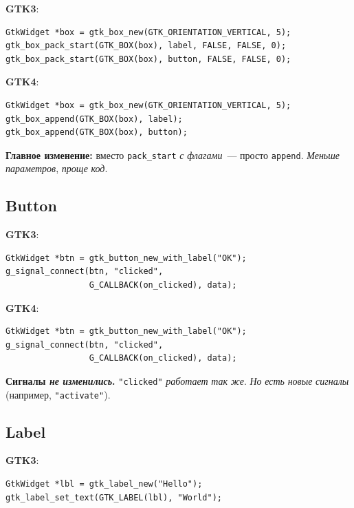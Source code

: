 \textbf{GTK3}:
\begin{verbatim}
GtkWidget *box = gtk_box_new(GTK_ORIENTATION_VERTICAL, 5);
gtk_box_pack_start(GTK_BOX(box), label, FALSE, FALSE, 0);
gtk_box_pack_start(GTK_BOX(box), button, FALSE, FALSE, 0);
\end{verbatim}

\textbf{GTK4}:
\begin{verbatim}
GtkWidget *box = gtk_box_new(GTK_ORIENTATION_VERTICAL, 5);
gtk_box_append(GTK_BOX(box), label);
gtk_box_append(GTK_BOX(box), button);
\end{verbatim}

\begin{keybox}
\textbf{Главное изменение:} вместо \texttt{pack\_start}
\emph{с} \emph{флагами}~--- просто \texttt{append}. \emph{Меньше}
\emph{параметров}, \emph{проще} \emph{код}.
\end{keybox}

\subsection{Button}

\textbf{GTK3}:
\begin{verbatim}
GtkWidget *btn = gtk_button_new_with_label("OK");
g_signal_connect(btn, "clicked",
                 G_CALLBACK(on_clicked), data);
\end{verbatim}

\textbf{GTK4}:
\begin{verbatim}
GtkWidget *btn = gtk_button_new_with_label("OK");
g_signal_connect(btn, "clicked",
                 G_CALLBACK(on_clicked), data);
\end{verbatim}

\begin{notebox}
\textbf{Сигналы \emph{не} \emph{изменились}.} \texttt{"clicked"}
\emph{работает} \emph{так} \emph{же}. \emph{Но} \emph{есть}
\emph{новые} \emph{сигналы} (например, \texttt{"activate"}).
\end{notebox}

\subsection{Label}

\textbf{GTK3}:
\begin{verbatim}
GtkWidget *lbl = gtk_label_new("Hello");
gtk_label_set_text(GTK_LABEL(lbl), "World");
\end{verbatim}

